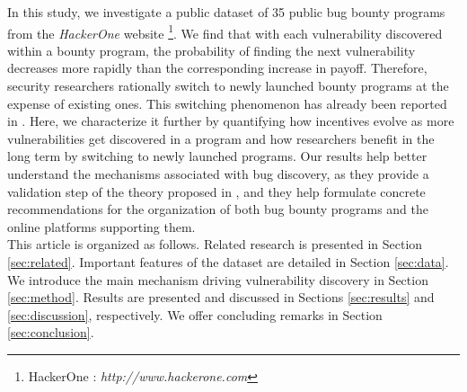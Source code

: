 In this study, we investigate a public dataset of 35 public bug bounty programs from the {\it HackerOne} website \footnote{HackerOne : {\it http://www.hackerone.com}}. We find that with each vulnerability discovered within a bounty program, the probability of finding the next vulnerability decreases more rapidly than the corresponding increase in payoff. Therefore, security researchers rationally switch to newly launched bounty programs at the expense of existing ones. This switching phenomenon has already been reported in \cite{zhao2015empirical}. Here, we characterize it further by quantifying how incentives evolve as more vulnerabilities get discovered in a program and how researchers benefit in the long term by switching to newly launched programs. Our results help better understand the mechanisms associated with bug discovery, as they provide a validation step of the theory proposed in \cite{brady1999murphy}, and they help formulate concrete recommendations for the organization of both bug bounty programs and the online platforms supporting them.\\

This article is organized as follows. Related research is presented in Section \ref{sec:related}. Important features of the dataset are detailed in Section \ref{sec:data}. We introduce the main mechanism driving vulnerability discovery in Section \ref{sec:method}. Results are presented and discussed in Sections \ref{sec:results} and \ref{sec:discussion}, respectively. We offer concluding remarks in Section \ref{sec:conclusion}.

